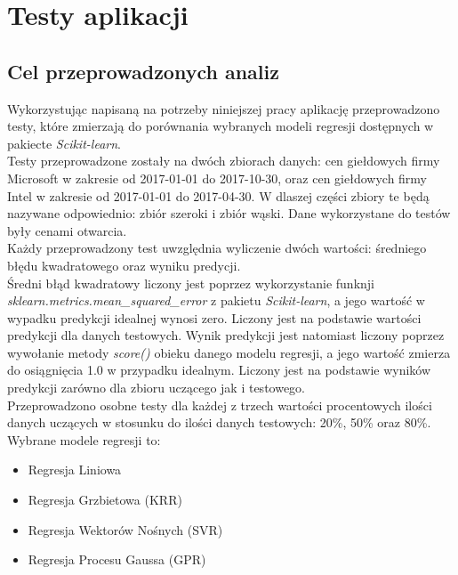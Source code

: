 
\chapter{Testy aplikacji}

\section{Cel przeprowadzonych analiz}

Wykorzystując napisaną na potrzeby niniejszej pracy aplikację przeprowadzono testy, które zmierzają do porównania wybranych modeli regresji dostępnych w pakiecte \textit{Scikit-learn}.\\

Testy przeprowadzone zostały na dwóch zbiorach danych: cen giełdowych firmy Microsoft w zakresie od 2017-01-01 do 2017-10-30, oraz cen giełdowych firmy Intel w zakresie od 2017-01-01 do 2017-04-30.
W dlaszej części zbiory te będą nazywane odpowiednio: zbiór szeroki i zbiór wąski.
Dane wykorzystane do testów były cenami otwarcia.\\

Każdy przeprowadzony test uwzględnia wyliczenie dwóch wartości: średniego błędu kwadratowego oraz wyniku predycji.\\

Średni błąd kwadratowy liczony jest poprzez wykorzystanie funknji \textit{sklearn.metrics.mean\_squared\_error} z pakietu \textit{Scikit-learn}, a jego wartość w wypadku predykcji idealnej wynosi zero.
Liczony jest na podstawie wartości predykcji dla danych testowych.
Wynik predykcji jest natomiast liczony poprzez wywołanie metody \textit{score()} obieku danego modelu regresji, a jego wartość zmierza do osiągnięcia 1.0 w przypadku idealnym.
Liczony jest na podstawie wyników predykcji zarówno dla zbioru uczącego jak i testowego.\\

Przeprowadzono osobne testy dla każdej z trzech wartości procentowych ilości danych uczących w stosunku do ilości danych testowych: 20\%, 50\% oraz 80\%.\\

Wybrane modele regresji to:
\begin{itemize}
 \item Regresja Liniowa
 \item Regresja Grzbietowa (KRR)
 \item Regresja Wektorów Nośnych (SVR)
 \item Regresja Procesu Gaussa (GPR)
\end{itemize}

